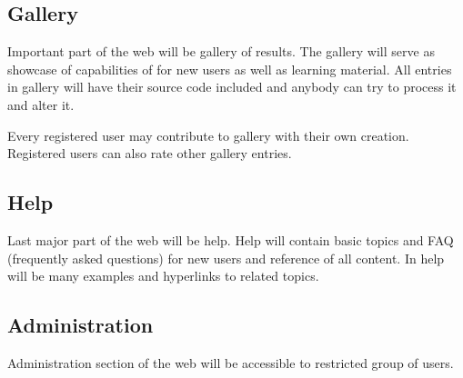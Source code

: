 \subsection{Gallery}

Important part of the web will be gallery of results.
The gallery will serve as showcase of capabilities of \lsystems for new users as well as learning material.
All entries in gallery will have their source code included and anybody can try to process it and alter it.

Every registered user may contribute to gallery with their own creation.
Registered users can also rate other gallery entries.


\subsection{Help}

Last major part of the web will be help.
Help will contain basic topics and FAQ (frequently asked questions) for new users and reference of all content.
In help will be many examples and hyperlinks to related topics.


\subsection{Administration}

Administration section of the web will be accessible to restricted group of users.




















